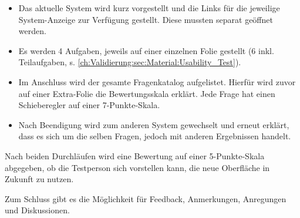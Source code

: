 \begin{itemize}
    \item Das aktuelle System wird kurz vorgestellt und die Links für die jeweilige System-Anzeige zur Verfügung gestellt. Diese mussten separat geöffnet werden.
    \item Es werden 4 Aufgaben, jeweils auf einer einzelnen Folie gestellt (6 inkl. Teilaufgaben, s. \autoref{ch:Validierung:sec:Material:Usability_Test}).
    \item Im Anschluss wird der gesamte Fragenkatalog aufgelistet. Hierfür wird zuvor auf einer Extra-Folie die Bewertungsskala erklärt. Jede Frage hat einen Schieberegler auf einer 7-Punkte-Skala.
    \item Nach Beendigung wird zum anderen System gewechselt und erneut erklärt, dass es sich um die selben Fragen, jedoch mit anderen Ergebnissen handelt.
\end{itemize}

\noindent
Nach beiden Durchläufen wird eine Bewertung auf einer 5-Punkte-Skala abgegeben, ob die Testperson sich vorstellen kann, die neue Oberfläche in Zukunft zu nutzen.

Zum Schluss gibt es die Möglichkeit für Feedback, Anmerkungen, Anregungen und Diskussionen.



